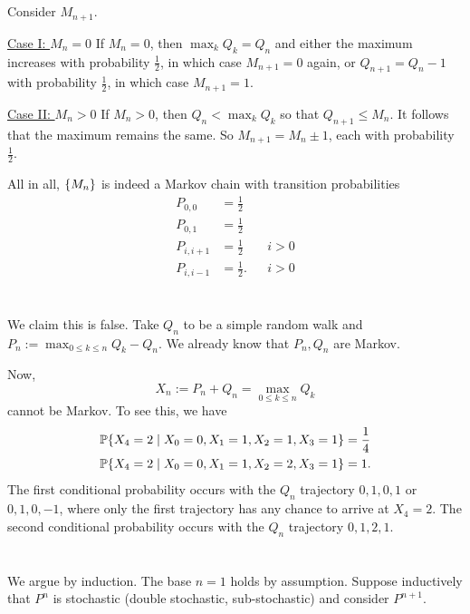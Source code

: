 \documentclass[10pt]{article}
\DeclarePairedDelimiter{\set}{\lbrace}{\rbrace}
\renewcommand{\P}{\mathbb{P}}
\begin{document}
\subsection{}
Consider $M_{n+1}$.

\underline{Case I: $M_n = 0$}
If $M_n = 0$,
then $\max_k Q_k = Q_n$ and either the maximum increases with probability $\frac12$,
in which case $M_{n+1} = 0$ again,
or $Q_{n+1} = Q_n - 1$ with probability $\frac12$,
in which case $M_{n+1} = 1$.

\underline{Case II: $M_n > 0$}
If $M_n > 0$,
then $Q_n < \max_k Q_k$ so that $Q_{n+1}\leq M_n$.
It follows that the maximum remains the same.
So $M_{n+1} = M_n \pm 1$,
each with probability $\frac12$.

All in all,
$\set{M_n}$ is indeed a Markov chain
with transition probabilities
\begin{align*}
  P_{0, 0} &= \frac12 \\
  P_{0, 1} &= \frac12 \\
  P_{i, i+1} &= \frac12 &&i > 0 \\
  P_{i, i-1} &= \frac12. &&i > 0
\end{align*}

\clearpage
\section{}
We claim this is false.
Take $Q_n$ to be a simple random walk
and $P_n := \max_{0\leq k\leq n} Q_k - Q_n$.
We already know that $P_n, Q_n$ are Markov.

Now,
\[
  X_n := P_n + Q_n = \max_{0\leq k\leq n} Q_k
\]
cannot be Markov.
To see this,
we have
\begin{align*}
  \P\set{X_4 = 2\mid X_0 = 0, X_1 = 1, X_2 = 1, X_3 = 1} &= \frac14 \\
  \P\set{X_4 = 2\mid X_0 = 0, X_1 = 1, X_2 = 2, X_3 = 1} &= 1.
\end{align*}
The first conditional probability occurs with the $Q_n$ trajectory $0, 1, 0, 1$
or $0, 1, 0, -1$,
where only the first trajectory has any chance to arrive at $X_4=2$.
The second conditional probability occurs with the $Q_n$ trajectory $0, 1, 2, 1$.

\clearpage
\section{}
We argue by induction.
The base $n=1$ holds by assumption.
Suppose inductively that $P^n$ is stochastic (double stochastic, sub-stochastic)
and consider $P^{n+1}$.
\end{document}
